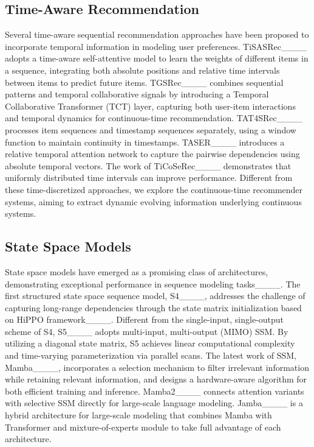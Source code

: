 \subsection{Time-Aware Recommendation}
Several time-aware sequential recommendation approaches have been proposed to incorporate temporal information in modeling user preferences. TiSASRec____ adopts a time-aware self-attentive model to learn the weights of different items in a sequence, integrating both absolute positions and relative time intervals between items to predict future items. TGSRec____ combines sequential patterns and temporal collaborative signals by introducing a Temporal Collaborative Transformer (TCT) layer, capturing both user-item interactions and temporal dynamics for continuous-time recommendation. TAT4SRec____ processes item sequences and timestamp sequences separately, using a window function to maintain continuity in timestamps. TASER____ introduces a relative temporal attention network to capture the pairwise dependencies using absolute temporal vectors. The work of TiCoSeRec____ demonstrates that uniformly distributed time intervals can improve performance. Different from these time-discretized approaches, we explore the continuous-time recommender systems, aiming to extract dynamic evolving information underlying continuous systems.

\subsection{State Space Models}
State space models have emerged as a promising class of architectures, demonstrating exceptional performance in sequence modeling tasks____. The first structured state space sequence model, S4____, addresses the challenge of capturing long-range dependencies through the state matrix initialization based on HiPPO framework____. Different from the single-input, single-output scheme of S4, S5____ adopts multi-input, multi-output (MIMO) SSM. By utilizing a diagonal state matrix, S5 achieves linear computational complexity and time-varying parameterization via parallel scans. The latest work of SSM, Mamba____, incorporates a selection mechanism to filter irrelevant information while retaining relevant information, and designs a hardware-aware algorithm for both efficient training and inference. Mamba2____ connects attention variants with selective SSM directly for large-scale language modeling. Jamba____ is a hybrid architecture for large-scale modeling that combines Mamba with Transformer and mixture-of-experts module to take full advantage of each architecture.


